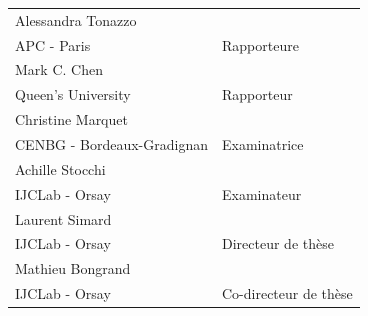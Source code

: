 \documentclass[a4paper]{article}
\newcommand{\jurynameA}{Achille Stocchi}
\newcommand{\juryadressA}{IJCLab - Orsay}
\newcommand{\juryroleA}{Examinateur}
\newcommand{\jurynameB}{Alessandra Tonazzo}
\newcommand{\juryadressB}{APC - Paris}
\newcommand{\juryroleB}{Rapporteure}
\newcommand{\jurynameD}{Mark C. Chen}
\newcommand{\juryadressD}{Queen's University}
\newcommand{\juryroleD}{Rapporteur}
\newcommand{\jurynameE}{Christine Marquet}
\newcommand{\juryadressE}{CENBG - Bordeaux-Gradignan}
\newcommand{\juryroleE}{Examinatrice}
\newcommand{\jurynameH}{Laurent Simard}
\newcommand{\juryadressH}{IJCLab - Orsay}
\newcommand{\juryroleH}{Directeur de thèse}
\newcommand{\jurynameI}{Mathieu Bongrand}
\newcommand{\juryadressI}{IJCLab - Orsay}
\newcommand{\juryroleI}{Co-directeur de thèse}
\begin{document}
\begin{textblock}{12}
	\label{jury} 																				%
        \begin{center}
	\begin{tabular}{@{} L{8.5cm} R{2.5cm}}
		\jurynameB  \\ \juryadressB & \juryroleB \\[7pt]
		\jurynameD  \\ \juryadressD & \juryroleD \\[7pt]
		\jurynameE  \\ \juryadressE & \juryroleE \\[7pt]
                \jurynameA  \\ \juryadressA & \juryroleA \\[7pt]
		\jurynameH  \\ \juryadressH & \juryroleH \\[7pt]
		\jurynameI  \\ \juryadressI & \juryroleI \\[7pt]

	\end{tabular}
	\end{center}
\end{textblock}
\end{document}

